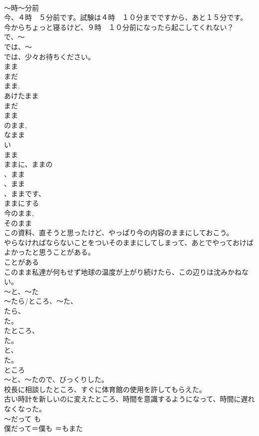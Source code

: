 \documentclass[8pt]{extreport}
\begin{document}
\begin{CJK}{UTF8}{min}
\\	～時～分前	
\\	今、４時　５分前です。試験は４時　１０分までですから、あと１５分です。 
\\	今からちょっと寝るけど、９時　１０分前になったら起こしてくれない？ 
\\	で、～	
\\	では、～ 
\\	では、少々お待ちください。 
\\	まま	
\\	まだ
\\	まま. 
\\	あけたまま 
\\	まだ
\\	まま 
\\	のまま, 
\\	なまま 
\\	い
\\	まま 
\\	ままに、ままの
\\	、まま
\\	、まま
\\	、ままです、
\\	ままにする　
\\	今のまま, 
\\	そのまま 
\\	この資料、直そうと思ったけど、やっぱり今の内容のままにしておこう。 
\\	やらなければならないことをついそのままにしてしまって、あとでやっておけばよかったと思うことがある。 
\\	ことがある 
\\	このまま私達が何もせず地球の温度が上がり続けたら、この辺りは沈みかねない。 
\\	～と、～た	
\\	～たら/ところ、～た、
\\	たら、
\\	た。 
\\	たところ、
\\	た。 
\\	と、
\\	た。 
\\	ところ 
\\	～と、～たので、びっくりした。　
\\	校長に相談したところ、すぐに体育館の使用を許してもらえた。 
\\	古い時計を新しいのに変えたところ、時間を意識するようになって、時間に遅れなくなった。 
\\	～だって	も 
\\	僕だって＝僕も ＝もまた 

\end{CJK}
\end{document}

